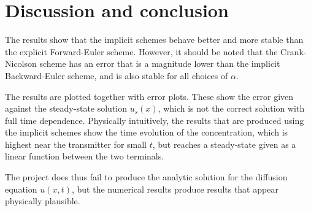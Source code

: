 \documentclass[a4paper,11pt]{article}
\begin{document}
\section{Discussion and conclusion}
The results show that the implicit schemes behave better and more stable than the explicit Forward-Euler scheme. However, it should be noted that the Crank-Nicolson scheme has an error that is a magnitude lower than the implicit Backward-Euler scheme, and is also stable for all choices of $\alpha$. 

The results are plotted together with error plots. These show the error given against the steady-state solution $u_s(x)$, which is not the correct solution with full time dependence. Physically intuitively, the results that are produced using the implicit schemes show the time evolution of the concentration, which is highest near the transmitter for small $t$, but reaches a steady-state given as a linear function between the two terminals.

The project does thus fail to produce the analytic solution for the diffusion equation $u(x,t)$, but the numerical results produce results that appear physically plausible.



\end{document}
